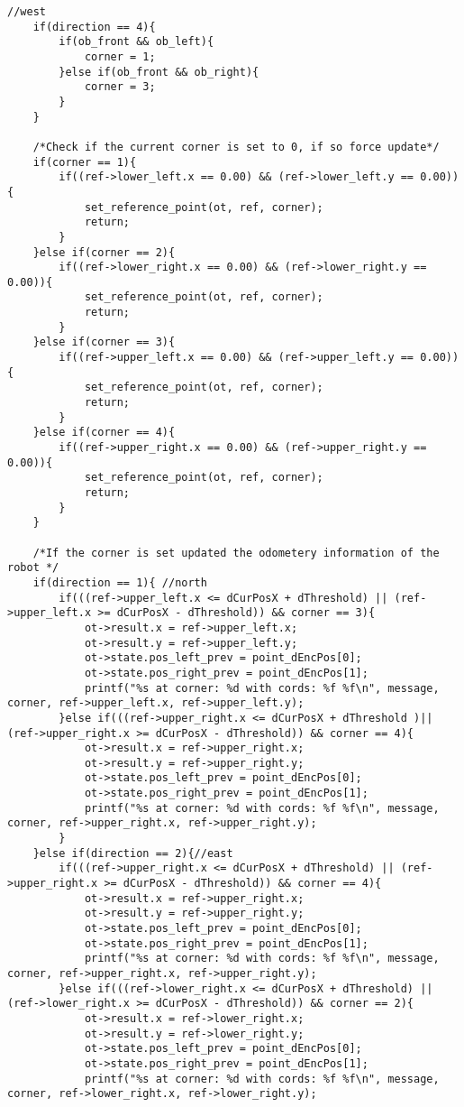 \begin{lstlisting}[caption={Function which checks if a reference point has been reached}]
	//west
	if(direction == 4){
		if(ob_front && ob_left){
			corner = 1;
		}else if(ob_front && ob_right){
			corner = 3;
		}
	}

	/*Check if the current corner is set to 0, if so force update*/
	if(corner == 1){
		if((ref->lower_left.x == 0.00) && (ref->lower_left.y == 0.00)){
			set_reference_point(ot, ref, corner);
			return;
		}
	}else if(corner == 2){
		if((ref->lower_right.x == 0.00) && (ref->lower_right.y == 0.00)){
			set_reference_point(ot, ref, corner);
			return;
		}
	}else if(corner == 3){
		if((ref->upper_left.x == 0.00) && (ref->upper_left.y == 0.00)){
			set_reference_point(ot, ref, corner);
			return;
		}
	}else if(corner == 4){
		if((ref->upper_right.x == 0.00) && (ref->upper_right.y == 0.00)){
			set_reference_point(ot, ref, corner);
			return;
		}
	}

	/*If the corner is set updated the odometery information of the robot */
	if(direction == 1){ //north 
		if(((ref->upper_left.x <= dCurPosX + dThreshold) || (ref->upper_left.x >= dCurPosX - dThreshold)) && corner == 3){
			ot->result.x = ref->upper_left.x;
			ot->result.y = ref->upper_left.y;
			ot->state.pos_left_prev = point_dEncPos[0];
			ot->state.pos_right_prev = point_dEncPos[1]; 
			printf("%s at corner: %d with cords: %f %f\n", message, corner, ref->upper_left.x, ref->upper_left.y);
		}else if(((ref->upper_right.x <= dCurPosX + dThreshold )|| (ref->upper_right.x >= dCurPosX - dThreshold)) && corner == 4){
			ot->result.x = ref->upper_right.x;
			ot->result.y = ref->upper_right.y;
			ot->state.pos_left_prev = point_dEncPos[0];
			ot->state.pos_right_prev = point_dEncPos[1]; 
			printf("%s at corner: %d with cords: %f %f\n", message, corner, ref->upper_right.x, ref->upper_right.y);
		}
	}else if(direction == 2){//east 
		if(((ref->upper_right.x <= dCurPosX + dThreshold) || (ref->upper_right.x >= dCurPosX - dThreshold)) && corner == 4){
			ot->result.x = ref->upper_right.x;
			ot->result.y = ref->upper_right.y;
			ot->state.pos_left_prev = point_dEncPos[0];
			ot->state.pos_right_prev = point_dEncPos[1]; 
			printf("%s at corner: %d with cords: %f %f\n", message, corner, ref->upper_right.x, ref->upper_right.y);
		}else if(((ref->lower_right.x <= dCurPosX + dThreshold) || (ref->lower_right.x >= dCurPosX - dThreshold)) && corner == 2){
			ot->result.x = ref->lower_right.x;
			ot->result.y = ref->lower_right.y;
			ot->state.pos_left_prev = point_dEncPos[0];
			ot->state.pos_right_prev = point_dEncPos[1]; 
			printf("%s at corner: %d with cords: %f %f\n", message, corner, ref->lower_right.x, ref->lower_right.y);

\end{lstlisting}
